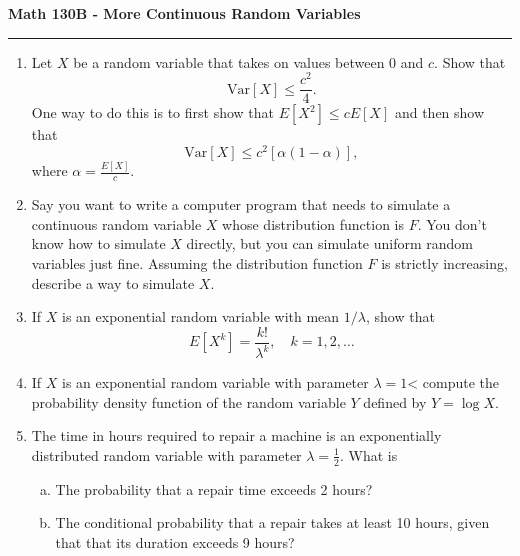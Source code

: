 \documentclass[11pt,letterpaper]{report}
\newcommand{\Var}{\text{Var}}
\begin{document}
\begin{center}
{\bf \Large Math 130B - More Continuous Random Variables}
\vspace{0.2cm}
\hrule
\end{center}


\begin{enumerate}
	\item Let $X$ be a random variable that takes on values between 0 and $c$. Show that
	\[
	\Var[X] \leq \frac{c^2}{4}.
	\]
	One way to do this is to first show that $E[X^2]\leq cE[X]$ and then show that
	\[
	\Var[X] \leq c^2[\alpha(1-\alpha)],
	\]
	where $\alpha = \frac{E[X]}{c}$.

	\item Say you want to write a computer program that needs to simulate a continuous random variable $X$ whose distribution function is $F$. You don't know how to simulate $X$ directly, but you can simulate uniform random variables just fine. Assuming the distribution function $F$ is strictly increasing, describe a way to simulate $X$.

	\item If $X$ is an exponential random variable with mean $1/\lambda$, show that
	\[
	E[X^k] = \frac{k!}{\lambda^k},\quad k = 1, 2, \ldots
	\]

	\item If $X$ is an exponential random variable with parameter $\lambda = 1$< compute the probability density function of the random variable $Y$ defined by $Y = \log X$.

	\item The time in hours required to repair a machine is an exponentially distributed random variable with parameter $\lambda = \frac{1}{2}$. What is
	\begin{enumerate}[(a)]
		\item The probability that a repair time exceeds 2 hours?
		\item The conditional probability that a repair takes at least 10 hours, given that that its duration exceeds 9 hours?
	\end{enumerate}
\end{enumerate}
\end{document}

